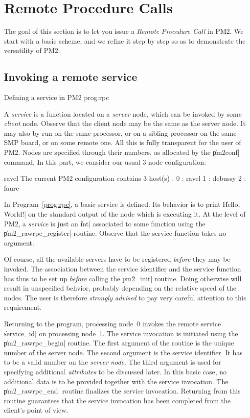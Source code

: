 \section{Remote Procedure Calls}

The goal of this section is to let you issue a \emph{Remote Procedure
  Call} in PM2. We start with a basic scheme, and we refine it step by
  step so as to demonstrate the versatility of PM2.

\subsection{Invoking a remote service}

 {Defining a service in PM2} {prog:rpc}

A \emph{service} is a function located on a \emph{server} node, which
can be invoked by some \emph{client} node. Observe that the client
node may be the same as the server node. It may also by run on the
same processor, or on a sibling processor on the same SMP board, or on
some remote one. All this is fully transparent for the user of PM2.
Nodes are specified through their numbers, as allocated by the
\|pm2conf| command. In this part, we consider our usual 3-node
configuration:
\begin{shell}
ravel%
The current PM2 configuration contains 3 host(s) :
0 : ravel
1 : debussy
2 : faure
\end{shell}

In Program~\ref{prog:rpc}, a basic service is defined. Its behavior is
to print \|Hello, World!| on the standard output of the node which is
executing it. At the level of PM2, a \emph{service} is just an \|int|
associated to some function using the \|pm2_rawrpc_register| routine.
Observe that the service function takes no argument.

Of course, all the available servers have to be registered
\emph{before} they may be invoked. The association between the service
identifier and the service function has thus to be set up
\emph{before} calling the \|pm2_init| routine. Doing otherwise will
result in unspecified behvior, probably depending on the relative
speed of the nodes. The user is therefore \emph{strongly advised} to
pay very careful attention to this requirement.

Returning to the program, processing node~0 invokes the remote service
\|service_id| on processing node~1. The service invocation is
initiated using the \|pm2_rawrpc_begin| routine.  The first
argument of the routine is the unique number of the server node.  The
second argument is the service identifier. It has to be a valid number
on the \emph{server node}.  The third argument is used for specifying
additional \emph{attributes} to be discussed later. In this basic
case, no additional data is to be provided together with the service
invocation. The \|pm2_rawrpc_end| routine finalizes the service
invocation. Returning from this routine guarantees that the service
invocation has been completed from the client's point of view.

